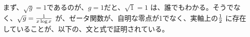 \documentclass{jsarticle}
\begin{document}
 \newcommand{\whitewithbodercirclevarint}{%
	 \begin{picture}(13,13)
		 \put(0,0){\scalebox{2.0}[2]{$\whitewithbodercircle$}}
		 \put(0,0){\scalebox{2.0}[2]{$\varint$}}
	 \end{picture}%
	 }
 
 \newcommand{\whitewithbodercirclevariiint}{%
	 \begin{picture}(13,13)
		 \put(0,0){\scalebox{2.0}[2]{$\whitewithbodercircle$}}
		 \put(0,0){\scalebox{2.0}[2]{$\variiint$}}
	 \end{picture}%
	 }
 
 \newcommand{\average}{%
	  \begin{picture}(30,45)
		  \put(0,0){\scalebox{2.0}[2]{$\square$}}
		  \put(4,4){$\setminus$}
	  \end{picture}%
  } 
  \newcommand{\smallaverage}{%
	  \begin{picture}(30,45)
		  \put(0,0){\scalebox{1.0}[1]{$\square$}}
		  \put(0,0){$\setminus$}
	  \end{picture}%
  } 
 
  \newcommand{\whitewithboder}{%
	  \begin{picture}(15,30)
		  \put(0,0){\scalebox{2.0}[2]{$\square$}}
		  \put(4,4){$\square$}
	  \end{picture}%
  } 
  \newcommand{\whitewithnabla}{%
	  \begin{picture}(15,30)
		  \put(0,0){\scalebox{2.0}[2]{$\nabla$}}
		  \put(3,3){$\nabla$}
	  \end{picture}%
  } 




  まず、$ \sqrt{g} = 1 $であるのが、$g = 1$だと、$\sqrt{1} = 1$
  は、誰でもわかる。そうでなく、$\sqrt{g} = {1 \over {x\log x}}$
  が、ゼータ関数が、自明な零点が1でなく、実軸上の${1 \over 2}$
  に存在していることが、以下の、文と式で証明されている。
\end{document}
